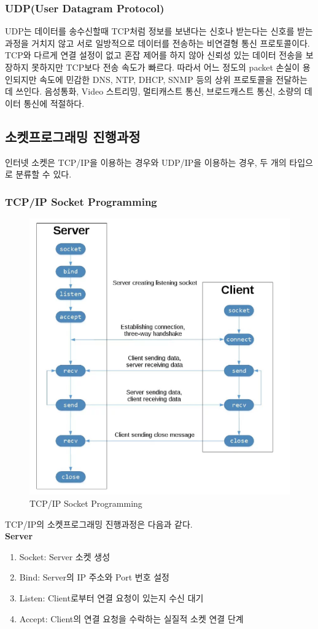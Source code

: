     \subsubsection*{UDP(User Datagram Protocol)}
    UDP는 데이터를 송수신할때 TCP처럼 정보를 보낸다는 신호나 받는다는 신호를 받는 과정을 거치지 않고 서로 일방적으로 데이터를 전송하는 비연결형 통신 프로토콜이다. TCP와 다르게 연결 설정이 없고 혼잡 제어를 하지 않아 신뢰성 있는 데이터 전송을 보장하지 못하지만 TCP보다 전송 속도가 빠르다. 따라서 어느 정도의 packet 손실이 용인되지만 속도에 민감한 DNS, NTP, DHCP, SNMP 등의 상위 프로토콜을 전달하는데 쓰인다. 음성통화, Video 스트리밍, 멀티캐스트 통신, 브로드캐스트 통신, 소량의 데이터 통신에 적절하다. \\

\newpage    
\subsection{소켓프로그래밍 진행과정}    
    인터넷 소켓은 TCP/IP을 이용하는 경우와 UDP/IP을 이용하는 경우, 두 개의 타입으로 분류할 수 있다. \\
    
    \subsubsection*{TCP/IP Socket Programming}
    \vspace{-4mm}
    \begin{figure}[!h]\centering
		\includegraphics[width=.65\textwidth]{image/week07/1-3.png}
		\caption{\small TCP/IP Socket Programming}
		\vspace{-10pt}
    \end{figure}
    TCP/IP의 소켓프로그래밍 진행과정은 다음과 같다. \\
    \textbf{Server}
    \begin{enumerate}
        \item Socket: Server 소켓 생성
        \item Bind: Server의 IP 주소와 Port 번호 설정
        \item Listen: Client로부터 연결 요청이 있는지 수신 대기
        \item Accept: Client의 연결 요청을 수락하는 실질적 소켓 연결 단계
    \end{enumerate}
    
